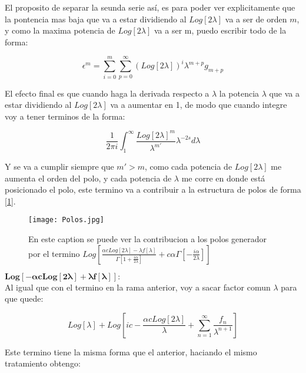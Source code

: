 El proposito de separar la seunda serie así, es para poder ver explicitamente que la pontencia mas baja que va a estar dividiendo al $Log[2 \lambda] $ va a ser de orden $m$, y como la maxima potencia de $Log[2 \lambda]$ va a ser m, puedo escribir todo de la forma:

\begin{equation}
\epsilon ^m = 
\sum _{i=0} ^m \sum _{p=0} ^{\infty} { (Log[2 \lambda]) ^i}{\lambda ^{m+p}} g _{m+p}
\end{equation}


El efecto final es que cuando haga la derivada respecto a $\lambda$ la potencia $\lambda$ que va a estar dividiendo al $Log[2 \lambda]$ va a aumentar en 1, de modo que cuando integre voy a tener terminos de la forma:

\begin{equation}
\frac{1}{2 \pi i} 
\int _{1} ^{\infty} \frac{Log[2 \lambda] ^{m}}{\lambda ^{m'}} \lambda ^{-2s} d \lambda
\end{equation}

Y se va a cumplir siempre que $m'> m$, como cada potencia de $Log[2 \lambda]$ me aumenta el orden del polo, y cada potencia de $\lambda$ me corre en donde está posicionado el polo, este termino va a contribuir a la estructura de polos de forma [\ref{fig:Dibujo}]. \\

\begin{figure}
    \centering
    \texttt{[image: Polos.jpg]}
    \caption{En este caption se puede ver la contribucion a los polos generador por el termino $Log[
	\frac{\alpha c Log[2 \lambda] - \lambda f[\lambda] }{\Gamma \left[1 + \frac{i \alpha}{ 2 \lambda} \right] } + 
	c \alpha \Gamma \left[ - \frac{i \alpha}{2 \lambda} \right] ]$ }
    \label{fig:Dibujo}
\end{figure}

$\mathbf{
		Log[- \alpha c Log[2 \lambda] + \lambda f[\lambda] ]
		}: 
		$ \\

Al igual que con el termino en la rama anterior, voy a sacar factor comun $\lambda$ para que quede:

\begin{equation}
Log[\lambda] + 
Log[i c - \frac{\alpha c Log[2 \lambda] }{\lambda} + 
\sum _{n=1} ^{\infty} \frac{f _n}{\lambda ^{n+1}} ]
\end{equation}

Este termino tiene la misma forma que el anterior, haciando el mismo tratamiento obtengo:

